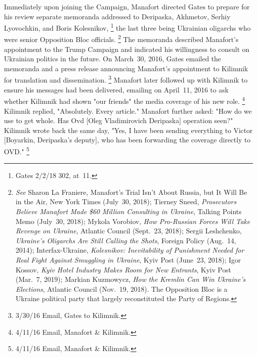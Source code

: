 Immediately upon joining the Campaign, Manafort directed Gates to prepare for his review separate memoranda addressed to Deripaska, Akhmetov, Serhiy Lyovochkin, and Boris Kolesnikov,%
\footnote{Gates 2/2/18 302, at~11.}
the last three being Ukrainian oligarchs who were senior Opposition Bloc officials.%
\footnote{\textit{See} Sharon La Franiere, Manafort's Trial Isn't About Russia, but It Will Be in the Air, New York Times (July~30, 2018);
Tierney Sneed, \textit{Prosecutors Believe Manafort Made \$60 Million Consulting in Ukraine}, Talking Points Memo (July~30, 2018);
Mykola Vorobiov, \textit{How Pro-Russian Forces Will Take Revenge on Ukraine}, Atlantic Council (Sept.~23, 2018);
Sergii Leshchenko, \textit{Ukraine's Oligarchs Are Still Calling the Shots}, Foreign Policy (Aug.~14, 2014);
Interfax-Ukraine, \textit{Kolesnikov: Inevitability of Punishment Needed for Real Fight Against Smuggling in Ukraine}, Kyiv Post (June~23, 2018);
Igor Kossov, \textit{Kyiv Hotel Industry Makes Room for New Entrants}, Kyiv Post (Mar.~7, 2019);
Markian Kuzmowycz, \textit{How the Kremlin Can Win Ukraine's Elections}, Atlantic Council (Nov.~19, 2018).
The Opposition Bloc is a Ukraine political party that largely reconstituted the Party of Regions.
}
The memoranda described Manafort's appointment to the Trump Campaign and indicated his willingness to consult on Ukrainian politics in the future.
On March~30, 2016, Gates emailed the memoranda and a press release announcing Manafort's appointment to Kilimnik for translation and dissemination.%
\footnote{3/30/16 Email, Gates to Kilimnik.}
Manafort later followed up with Kilimnik to ensure his messages had been delivered, emailing on April~11, 2016 to ask whether Kilimnik had shown "our friends" the media coverage of his new role.%
\footnote{4/11/16 Email, Manafort \& Kilimnik.}
Kilimnik replied, "Absolutely.
Every article."
Manafort further asked: "How do we use to get whole.
Has Ovd [Oleg Vladimirovich Deripaska] operation seen?"
Kilimnik wrote back the same day, "Yes, I have been sending everything to Victor [Boyarkin, Deripaska's deputy], who has been forwarding the coverage directly to OVD."%
\footnote{4/11/16 Email, Manafort \& Kilimnik.}

